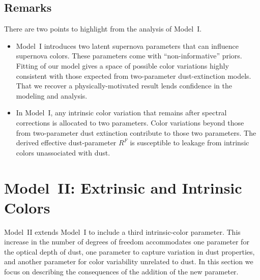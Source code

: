 \documentclass[trackchanges]{aastex61}   	%
\begin{document}
{\subsection{Remarks}
There are two points to highlight from the analysis of
Model~I.
\begin{itemize}
\item Model~I introduces two latent supernova parameters that can influence supernova colors.
These parameters come  with ``non-informative'' priors.  Fitting
of our model gives a space of possible color variations highly consistent with those expected from two-parameter dust-extinction models. 
That we recover a physically-motivated  result lends confidence in the modeling and analysis.
\item In Model~I, any  intrinsic color variation that remains after spectral corrections is allocated to two parameters.  Color variations beyond
those from two-parameter dust extinction contribute to those two parameters.   The derived effective dust-parameter $R^F$ 
is susceptible to leakage from intrinsic colors unassociated with dust.
\end{itemize}

\section{Model~II: Extrinsic and Intrinsic Colors}
\label{modelII:sec}
Model~II extends Model~I to include a third intrinsic-color parameter.  This increase in the number of degrees of freedom accommodates
one parameter for the optical depth of dust, one parameter to capture variation in dust properties, and
another parameter for  color variability unrelated to dust.  In this section we  focus on describing the consequences of the addition of the
new parameter.

}
\end{document}
